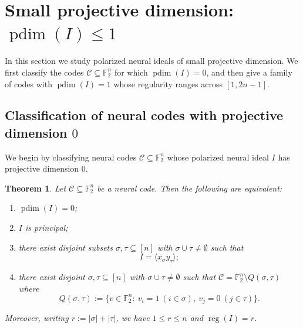 \documentclass[12pt]{amsart}
\newtheorem{theorem}{Theorem}[section]
\theoremstyle{remark}
\theoremstyle{definition}
\DeclareMathOperator{\reg}{reg}
\DeclareMathOperator{\pd}{pdim}
\newcommand{\F}{\mathbb{F}}
\newcommand{\C}{\mathcal{C}}
\begin{document}
\section{Small projective dimension: $\pd (I)\leq 1$}\label{sec:small-pdim}

In this section we study polarized neural ideals of small projective dimension. We first classify the codes
$\C\subseteq\F_2^n$ for which $\pd(I)=0$, and then give a family of codes with $\pd(I)=1$ whose regularity
ranges across $[1,2n-1]$.


\subsection{Classification of neural codes with projective dimension $0$}\label{sec:pdim0}

We begin by classifying neural codes $\C\subseteq\F_2^n$ whose polarized neural ideal $I$ has projective
dimension $0$.


\begin{theorem}\label{prop:pdim0_classification}
Let $\C\subseteq \F_2^n$ be a neural code. 
Then the following are equivalent:
\begin{enumerate}
\item $\pd(I)=0$;
\item $I$ is principal;
\item there exist disjoint subsets $\sigma,\tau\subseteq[n]$ with $\sigma\cup\tau\neq\emptyset$ such that
\[
I=\langle x_\sigma y_\tau\rangle;
\]
\item there exist disjoint $\sigma,\tau\subseteq[n]$ with $\sigma\cup\tau\neq\emptyset$ such that $\C=\F_2^n\setminus Q(\sigma,\tau)$ where
\[
Q(\sigma,\tau):=\{v\in \F_2^n:\ v_i=1\ (i\in\sigma),\ v_j=0\ (j\in\tau)\}.
\]
\end{enumerate}
Moreover, writing $r:=|\sigma|+|\tau|$, we have $1\le r\le n$ and $\reg(I)=r$.
\end{theorem}
\end{document}

